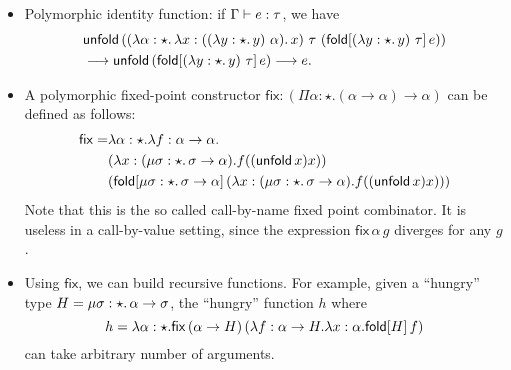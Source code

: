 \begin{itemize}
  \newcommand{\FPTypeU}{\miu{\sigma}{\star}{\sigma \to \alpha}}
  \newcommand{\FPTermfxx}{\lambda x:(\FPTypeU).f((\unfold{x})x)}
  \newcommand{\FP}{\mathsf{fix}} %
\item Polymorphic identity function: if $\Gamma \vdash e:\tau$, we have
  \begin{align*}
  & \mathsf{unfold}\,((\lambda \alpha:\star.\,\lambda x:((\lambda y:\star.\,y)~\alpha).\,x)~\tau~(\mathsf{fold}[(\lambda y:\star.\,y)~\tau]\,e))\\ &\longrightarrow \mathsf{unfold}\,(\mathsf{fold}[(\lambda y:\star.\,y)~\tau]\,e) \longrightarrow e.
  \end{align*}
\item A polymorphic fixed-point constructor
  $\FP:(\Pi \alpha:\star.(\alpha \to \alpha) \to \alpha)$ can be
  defined as follows:
  \begin{align*}
    \FP=&\lambda \alpha:\star . \lambda f:\alpha \to \alpha.\\
        &(\FPTermfxx)\\
        &(\fold{\FPTypeU}{(\FPTermfxx)})
  \end{align*}
  Note that this is the so called call-by-name fixed point
  combinator. It is useless in a call-by-value setting, since the
  expression $\FP\,\alpha\,g$ diverges for any $g$.
  \newcommand{\HGType}{\miu{\sigma}{\star}{\alpha \to \sigma}}%
\item Using $\FP$, we can build recursive functions. For example,
  given a ``hungry'' type $H=\HGType$, the ``hungry'' function $h$
  where
  \[h=\lambda \alpha:\star.\FP\,(\alpha \to H)\,(\lambda f:\alpha \to
  H.\lambda x:\alpha.\fold{H}{f})\]
  can take arbitrary number of arguments.
\end{itemize}

